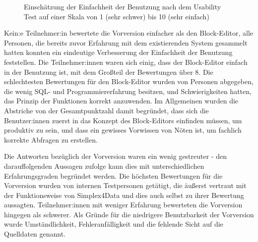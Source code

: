 
\begin{figure}[!ht]
  \datatable
  \centering
  \caption{Einschätzung der Einfachheit der Benutzung nach dem Usability
    Test auf einer Skala von 1 (sehr schwer) bis 10 (sehr einfach)}
  \label{fig:ges}
\end{figure}

Kein:e Teilnehmer:in bewertete die Vorversion einfacher als den Block-Editor, alle Personen, die bereits zuvor Erfahrung mit dem existierenden System gesammelt hatten konnten ein eindeutige Verbesserung der Einfachheit der Benutzung feststellen. Die Teilnehmer:innen waren sich einig, dass der Block-Editor einfach in der Benutzung ist, mit dem Großteil der Bewertungen über 8. Die schlechtesten Bewertungen für den Block-Editor wurden von Personen abgegeben, die wenig \ac{SQL}- und Programmiererfahrung besitzen, und Schwierigkeiten hatten, das Prinzip der Funktionen korrekt anzuwenden. Im Allgemeinen wurden die Abstriche von der Gesamtpunktzahl damit begründet, dass sich die Benutzer:innen zuerst in das Konzept des Block-Editors einfinden müssen, um produktiv zu sein, und dass ein gewisses Vorwissen von Nöten ist, um fachlich korrekte Abfragen zu erstellen.


Die Antworten bezüglich der Vorversion waren ein wenig gestreuter - den darauffolgenden Aussagen zufolge kann dies mit unterschiedlichen Erfahrungsgraden begründet werden. Die höchsten Bewertungen für die Vorversion wurden von internen Testpersonen getätigt, die äußerst vertraut mit der Funktionsweise von Simplex4Data und dies auch selbst zu ihrer Bewertung aussagten. Teilnehmer:innen mit weniger Erfahrung bewerteten die Vorversion hingegen als schwerer. Als Gründe für die niedrigere Benutzbarkeit der Vorversion wurde Umständlichkeit, Fehleranfälligkeit und die fehlende Sicht auf die Quelldaten genannt.
